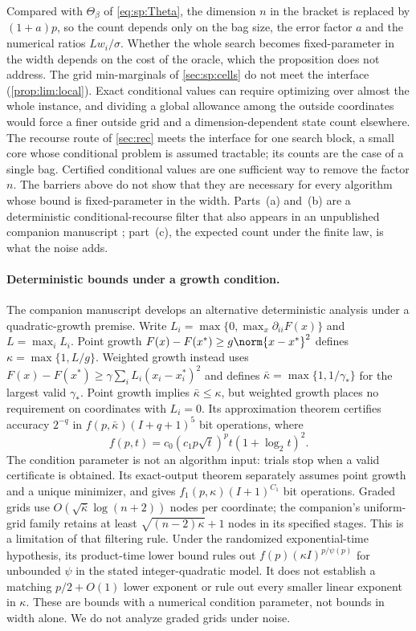 Compared with $\Theta_\beta$ of \eqref{eq:sp:Theta}, the dimension $n$ in
the bracket is replaced by $(1+a)p$, so the count depends only on the bag
size, the error factor $a$ and the numerical ratios $Lw_i/\sigma$. Whether the whole search
becomes fixed-parameter in the width depends on the cost of the oracle,
which the proposition does not address. The grid min-marginals of
\cref{sec:sp:cells} do not meet the interface (\cref{prop:lim:local}).
Exact conditional values can require optimizing over almost the whole
instance, and dividing a global allowance among the outside coordinates
would force a finer outside grid and a dimension-dependent state count
elsewhere. The recourse route of \cref{sec:rec} meets the interface for one
search block, a small core whose conditional problem is assumed tractable;
its counts are the case of a single bag. Certified conditional values are
one sufficient way to remove the factor $n$. The barriers above do not show
that they are necessary for every algorithm whose bound is fixed-parameter
in the width. Parts~(a) and~(b) are a deterministic conditional-recourse
filter that also appears in an unpublished companion manuscript
\citep{companion-decomposition-aware}; part~(c), the expected count under
the finite law, is what the noise adds.

\paragraph{Deterministic bounds under a growth condition.}
The companion manuscript \citep{companion-decomposition-aware} develops
an alternative deterministic analysis under a quadratic-growth premise.
Write $L_i=\max\{0,\max_x\partial_{ii}F(x)\}$ and $L=\max_iL_i$.
Point growth $F(x)-F(x^*)\ge g\norm{x-x^*}^2$ defines
$\kappa=\max\{1,L/g\}$. Weighted growth instead uses
$F(x)-F(x^*)\ge\gamma\sum_iL_i(x_i-x_i^*)^2$ and defines
$\bar\kappa=\max\{1,1/\gamma_*\}$ for the largest valid $\gamma_*$.
Point growth implies $\bar\kappa\le\kappa$, but weighted growth places
no requirement on coordinates with $L_i=0$.
Its approximation theorem certifies accuracy $2^{-q}$ in
$f(p,\bar\kappa)(I+q+1)^5$ bit operations, where
\[
 f(p,t)=c_0(c_1p\sqrt{t})^p t(1+\log_2t)^2.
\]
The condition parameter is not an algorithm input: trials stop when a
valid certificate is obtained. Its exact-output theorem separately assumes
point growth and a unique minimizer, and gives
$f_1(p,\kappa)(I+1)^{C_1}$ bit operations. Graded grids use
$O(\sqrt{\bar\kappa}\log(n+2))$ nodes per coordinate; the companion's
uniform-grid family retains at least $\sqrt{(n-2)\kappa}+1$ nodes in its
specified stages. This is a limitation of that filtering rule.
Under the randomized exponential-time hypothesis, its product-time lower
bound rules out $f(p)(\kappa I)^{p/\psi(p)}$ for unbounded $\psi$ in the
stated integer-quadratic model. It does not establish a matching
$p/2+O(1)$ lower exponent or rule out every smaller linear exponent in
$\kappa$. These are bounds with a numerical condition parameter, not
bounds in width alone. We do not analyze graded grids under noise.

